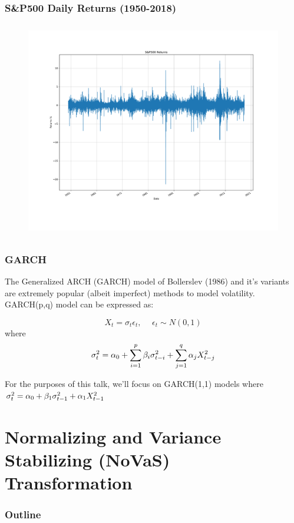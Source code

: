 \documentclass{beamer}
\begin{document}
\begin{frame}
\frametitle{S&P500 Daily Returns (1950-2018)}
\begin{figure}[h!]
\centering 
\includegraphics[height=3.75in, width=4.75in]{sp500_returns.pdf}
\end{figure}
\end{frame}


\begin{frame}
\frametitle{GARCH}
The Generalized ARCH (GARCH) model of Bollerslev (1986) and it's variants are extremely popular (albeit imperfect) methods to model volatility.\\
\vspace{15pt}
GARCH(p,q) model can be expressed as:

$$ X_t = \sigma_{t}\epsilon_{t}, \hspace{15pt} \epsilon_{t} \sim N(0,1) $$
where $$\sigma_{t}^{2} = \alpha_0 + \sum_{i=1}^{p} \beta_i \sigma_{t-i}^{2} + \sum_{j=1}^{q} \alpha_j X_{t-j}^{2}$$

For the purposes of this talk, we'll focus on GARCH(1,1) models where $\sigma_{t}^{2} = \alpha_0 + \beta_1 \sigma_{t-1}^{2} + \alpha_1 X_{t-1}^{2}$
\end{frame}

\section{Normalizing and Variance Stabilizing (NoVaS) Transformation}

\begin{frame}
\frametitle{Outline}
\tableofcontents[currentsection]
\end{frame}
\end{document}
